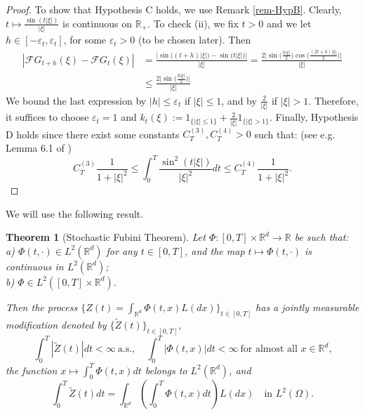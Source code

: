 \documentclass[12pt]{article}
\newtheorem{theorem}{Theorem}[section]
\def\cF{\mathcal{F}}
\def\bR{\mathbb{R}}
\def\e{\varepsilon}
\begin{document}
\begin{proof}
To show that Hypothesis C holds, we use Remark \ref{rem-HypB}.
Clearly, $t \mapsto \frac{\sin(t|\xi|)}{|\xi|}$ is continuous on $\bR_{+}$. To check (ii), we fix $t>0$ and we let $h \in [-\e_t,\e_t]$, for some $\e_t>0$ (to be chosen later). Then
\begin{align*}
|\cF G_{t+h}(\xi)-\cF G_t(\xi)|& = \frac{\big|\sin\big((t+h)|\xi|\big) -\sin\big(t|\xi|\big)\big|}{|\xi|}=\frac{2 \big|\sin\big(\frac{h|\xi|}{2} \big) \cos \big( \frac{(2t+h)|\xi|}{2}\big)\big|}{|\xi|} \\
& \leq \frac{2\big|\sin\big(\frac{h|\xi|}{2} \big)\big|}{|\xi|} 
\end{align*}
We bound the last expression by $|h| \leq \e_t$ if $|\xi|\leq 1$, and by $\frac{2}{|\xi|}$ if $|\xi|>1$. Therefore, it suffices to choose $\e_t=1$ and $k_t(\xi):=1_{\{|\xi| \leq 1\}}+\frac{2}{|\xi|}1_{\{|\xi| > 1\}}$.
Finally,  Hypothesis D holds since there exist some constants $C_T^{(3)},C_{T}^{(4)}>0$ such that: (see e.g. Lemma 6.1 of \cite{sanz05})
\[
C_{T}^{(3)} \frac{1}{1+|\xi|^2} \leq \int_0^T \frac{\sin^2(t|\xi|)}{|\xi|^2} dt \leq C_T^{(4)}\frac{1}{1+|\xi|^2}.
\]
\end{proof}



We will use the following result. 
\begin{theorem}[Stochastic Fubini Theorem]
\label{Fubini} Let $\Phi :[0,T] \times \bR^d \to \bR$ be such that:
\\
a) $\Phi(t,\cdot) \in L^2(\bR^d)$ for any $t \in [0,T]$, and the map $t \mapsto \Phi(t,\cdot)$ is continuous in $L^2(\bR^d)$;\\
b)  $\Phi  \in L^2([0,T] \times \bR^d)$.

Then the process $\{Z(t)=\int_{\bR^d}\Phi(t,x)L(dx)\}_{t \in [0,T] }$ has a jointly measurable modification denoted by $\{\widetilde{Z}(t)\}_{t \in [0,T]}$, 
\[
\int_0^T |\widetilde{Z}(t)|dt<\infty \ \mbox{a.s.},  \quad \int_0^T|\Phi(t,x)|dt<\infty \ \mbox{for almost all $x\in \bR^d$,}
\]
 the function $x\mapsto \int_0^T\Phi(t,x)dt$ belongs to $L^2(\bR^d)$, and
\begin{equation}
\label{Fubini-eq}
\int_0^T \widetilde{Z}(t) dt=\int_{\bR^d} \left( \int_0^T\Phi(t,x)dt \right) L(dx) \quad \mbox{in $L^2(\Omega)$}.
\end{equation}
\end{theorem}
\end{document}
